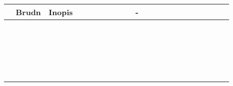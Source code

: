 \documentclass[10pt]{article}
\begin{document}
\begin{center}
\begin{tabular}{|c|c|c|c|c|c|c|c|c|c|c|c|c|c|c|c|c|c|c|c|c|c|}
\hline
 & Brudn & Inopis &  &  &  &  &  &  &  & - &  &  &  &  &  &  &  &  &  &  &  \\
\hline
 &  &  &  &  &  &  &  &  &  &  &  &  &  &  &  &  &  &  &  &  &  \\
\hline
 &  &  &  &  &  &  &  &  &  &  &  &  &  &  &  &  &  &  &  &  &  \\
\hline
 &  &  &  &  &  &  &  &  &  &  &  &  &  &  &  &  &  &  &  &  &  \\
\hline
 &  &  &  &  &  &  &  &  &  &  &  &  &  &  &  &  &  &  &  &  &  \\
\hline
 &  &  &  &  &  &  &  &  &  &  &  &  &  &  &  &  &  &  &  &  &  \\
\hline
 &  &  &  &  &  &  &  &  &  &  &  &  &  &  &  &  &  &  &  &  &  \\
\hline
 &  &  &  &  &  &  &  &  &  &  &  &  &  &  &  &  &  &  &  &  &  \\
\hline
 &  &  &  &  &  &  &  &  &  &  &  &  &  &  &  &  &  &  &  &  &  \\
\hline
 &  &  &  &  &  &  &  &  &  &  &  &  &  &  &  &  &  &  &  &  &  \\
\hline
 &  &  &  &  &  &  &  &  &  &  &  &  &  &  &  &  &  &  &  &  &  \\
\hline
 &  &  &  &  &  &  &  &  &  &  &  &  &  &  &  &  &  &  &  &  &  \\
\hline
 &  &  &  &  &  &  &  &  &  &  &  &  &  &  &  &  &  &  &  &  &  \\
\hline
 &  &  &  &  &  &  &  &  &  &  &  &  &  &  &  &  &  &  &  &  &  \\
\hline
 &  &  &  &  &  &  &  &  &  &  &  &  &  &  &  &  &  &  &  &  &  \\
\hline
 &  &  &  &  &  &  &  &  &  &  &  &  &  &  &  &  &  &  &  &  &  \\
\hline
 &  &  &  &  &  &  &  &  &  &  &  &  &  &  &  &  &  &  &  &  &  \\
\hline
 &  &  &  &  &  &  &  &  &  &  &  &  &  &  &  &  &  &  &  &  &  \\
\hline
 &  &  &  &  &  &  &  &  &  &  &  &  &  &  &  &  &  &  &  &  &  \\
\hline
 &  &  &  &  &  &  &  &  &  &  &  &  &  &  &  &  &  &  &  &  &  \\
\hline
 &  &  &  &  &  &  &  &  &  &  &  &  &  &  &  &  &  &  &  &  &  \\
\hline
 &  &  &  &  &  &  &  &  &  &  &  &  &  &  &  &  &  &  &  &  &  \\

\end{tabular}
\end{center}
\end{document}
